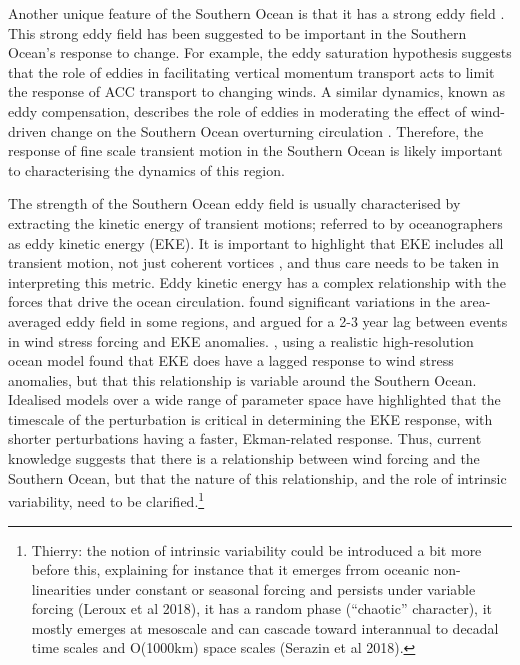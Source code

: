 \documentclass{agujournal2019}
\begin{document}
Another unique feature of the Southern Ocean is that it has a strong eddy field \citep{Fu2010}.
This strong eddy field has been suggested to be important in the Southern Ocean's response to change.
For example, the eddy saturation hypothesis \citep{Hallberg2006, Meredith-Hogg-2006, Munday2013, Constantinou2019} suggests that the role of eddies in facilitating vertical momentum transport acts to limit the response of ACC transport to changing winds.
A similar dynamics, known as eddy compensation, describes the role of eddies in moderating the effect of wind-driven change on the Southern Ocean overturning circulation \citep{Morrison2013a}.
Therefore, the response of fine scale transient motion in the Southern Ocean is likely important to characterising the dynamics of this region.

The strength of the Southern Ocean eddy field is usually characterised by extracting the kinetic energy of transient motions; referred to by oceanographers as eddy kinetic energy (EKE). 
It is important to highlight that EKE includes all transient motion, not just coherent vortices \citep{Martinez-Moreno2019}, and thus care needs to be taken in interpreting this metric.
Eddy kinetic energy has a complex relationship with the forces that drive the ocean circulation.
\citet{Meredith-Hogg-2006} found significant variations in the area-averaged eddy field in some regions, and argued for a 2-3 year lag between events in wind stress forcing and EKE anomalies.
\citet{Patara2016}, using a realistic high-resolution ocean model found that EKE does have a lagged response to wind stress anomalies, but that this relationship is variable around the Southern Ocean.
Idealised models over a wide range of parameter space \citep{Sinha2016} have highlighted that the timescale of the perturbation is critical in determining the EKE response, with shorter perturbations having a faster, Ekman-related response.
Thus, current knowledge suggests that there is a relationship between wind forcing and the Southern Ocean, but that the nature of this relationship, and the role of intrinsic variability, need to be clarified.\footnote{{\color{red}Thierry: the notion of intrinsic variability could be introduced a bit more before this, explaining for instance that it emerges frrom oceanic non-linearities under constant or seasonal forcing and persists under variable forcing (Leroux et al 2018), it has a random phase (``chaotic'' character), it mostly emerges at mesoscale and can cascade toward interannual to decadal time scales and O(1000km) space scales (Serazin et al 2018).}}
\end{document}
